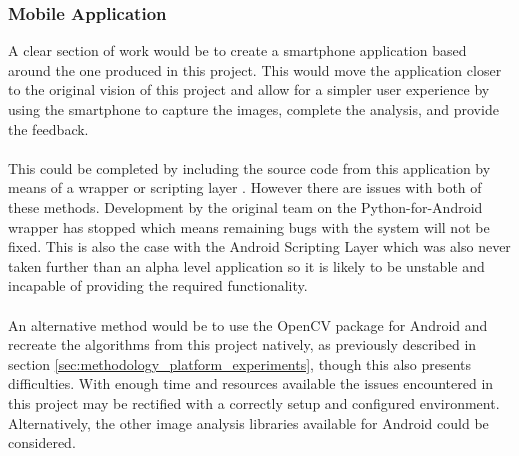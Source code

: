 		\subsubsection{Mobile Application}
			A clear section of work would be to create a smartphone application based around the one produced in this project. This would move the application closer to the original vision of this project and allow for a simpler user experience by using the smartphone to capture the images, complete the analysis, and provide the feedback.
			\\\\
			This could be completed by including the source code from this application by means of a wrapper \citep{kivy2015python} or scripting layer \citep{asl}. However there are issues with both of these methods. Development by the original team on the Python-for-Android wrapper has stopped which means remaining bugs with the system will not be fixed. This is also the case with the Android Scripting Layer which was also never taken further than an alpha level application so it is likely to be unstable and incapable of providing the required functionality.
			\\\\
			An alternative method would be to use the OpenCV package for Android and recreate the algorithms from this project natively, as previously described in section \ref{sec:methodology_platform_experiments}, though this also presents difficulties. With enough time and resources available the issues encountered in this project may be rectified with a correctly setup and configured environment. Alternatively, the other image analysis libraries available for Android could be considered.
